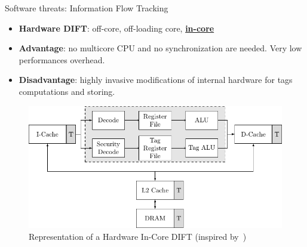 \begin{frame}{Software threats: Information Flow Tracking}
    \begin{minipage}[c]{0.45\textwidth}
        \begin{block}{}
            \begin{itemize}
                [square]
                \justifying
                    \item \textbf{Hardware DIFT}: off-core, off-loading core, \underline{\textbf{in-core}} \cite{DKK-07-sigarch}
            \end{itemize}
        \end{block}
        
        \begin{exampleblock}{}
            \begin{itemize}
                [square]
                \justifying
                \item \textbf{Advantage}: no multicore CPU and no synchronization are needed. Very low performances overhead.
            \end{itemize}
        \end{exampleblock}
        
        \begin{alertblock}{}
            \begin{itemize}
                [square]
                \justifying
                \item \textbf{Disadvantage}: highly invasive modifications of internal hardware for tags computations and storing.
            \end{itemize}
        \end{alertblock}
    \end{minipage}\hfill%
    \begin{minipage}[c]{0.5\textwidth}
        \begin{figure}
            \centering
            \includegraphics[width=\textwidth]{src/1_introduction/img/incore.pdf}
            \caption{Representation of a Hardware In-Core DIFT (inspired by~\cite{KDK-09-dsn})}
            \label{fig:incore}
        \end{figure}
    \end{minipage}
\end{frame}
